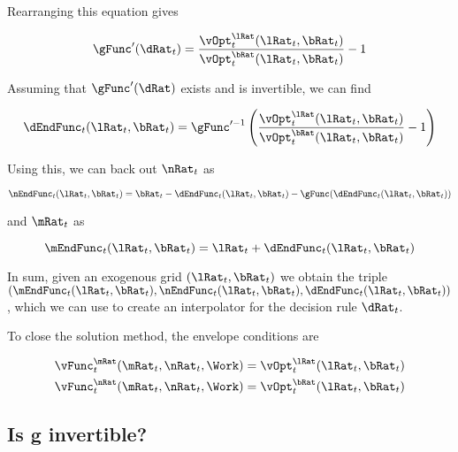 \documentclass[\econtexRoot/SequentialEGM]{subfiles}
\begin{document}
Rearranging this equation gives

\begin{equation}
        \gFunc'(\dRat_{t}) = \frac{\vOpt_{t}^{\lRat}(\lRat_{t},
                \bRat_{t})}{\vOpt_{t}^{\bRat}(\lRat_{t}, \bRat_{t})} - 1
\end{equation}

Assuming that $\gFunc'(\dRat)$ exists and is invertible, we can find


\begin{equation}
        \dEndFunc_{t}(\lRat_{t}, \bRat_{t}) = \gFunc'^{-1}\left(
        \frac{\vOpt_{t}^{\lRat}(\lRat_{t},
                \bRat_{t})}{\vOpt_{t}^{\bRat}(\lRat_{t},
                \bRat_{t})} - 1 \right)
\end{equation}

Using this, we can back out $\nRat_{t}$ as


\begin{equation}
        \nEndFunc_{t}(\lRat_{t}, \bRat_{t}) = \bRat_{t} -
        \dEndFunc_{t}(\lRat_{t}, \bRat_{t}) - \gFunc(\dEndFunc_{t}(\lRat_{t},
                \bRat_{t}))
\end{equation}

and $\mRat_{t}$ as

\begin{equation}
        \mEndFunc_{t}(\lRat_{t}, \bRat_{t}) = \lRat_{t} +
        \dEndFunc_{t}(\lRat_{t}, \bRat_{t})
\end{equation}

In sum, given an exogenous grid $(\lRat_{t}, \bRat_{t})$ we obtain the triple
$\left(\mEndFunc_{t}(\lRat_{t}, \bRat_{t}), \nEndFunc_{t}(\lRat_{t},
                \bRat_{t}), \dEndFunc_{t}(\lRat_{t}, \bRat_{t})\right)$, which
we can use to
create an interpolator for the decision rule $\dRat_{t}$.

To close the solution method, the envelope conditions are

\begin{equation}
        \begin{split}
                \vFunc_{t}^{\mRat}(\mRat_{t}, \nRat_{t}, \Work) & =
                \vOpt_{t}^{\lRat}(\lRat_{t}, \bRat_{t}) \\
                \vFunc_{t}^{\nRat}(\mRat_{t}, \nRat_{t}, \Work) & =
                \vOpt_{t}^{\bRat}(\lRat_{t}, \bRat_{t})
        \end{split}
\end{equation}

\subsection{Is g invertible?}
\end{document}
